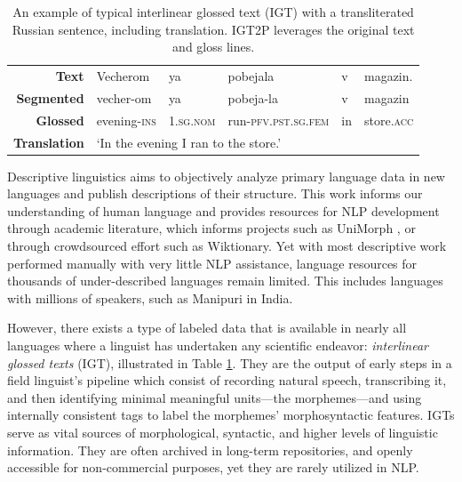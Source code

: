 \begin{table}[]
    \centering
    \begin{tabular}{rlllll}
       \textbf{Text}  & Vecherom & ya & pobejala & v & magazin. \\
      \textbf{Segmented}   & vecher-om & ya & pobeja-la & v & magazin \\
      \textbf{Glossed} & evening-\textsc{ins} & \textsc{1.sg.nom} & run-\textsc{pfv.pst.sg.fem} & in & store.\textsc{acc} \\
      \textbf{Translation} & \multicolumn{5}{l}{`In the evening I ran to the store.'}
    \end{tabular}
    \caption[IGT example]{An example of typical interlinear glossed text (IGT) with a transliterated Russian sentence, including translation. IGT2P leverages the original text and gloss lines.}
    \label{tab:IGT}
\end{table}


Descriptive linguistics aims to objectively analyze primary language data in new languages and publish descriptions of their structure. This work informs our understanding of human language and provides resources for NLP development through academic literature, which informs projects such as UniMorph \citep{kirov_unimorph}, or through crowdsourced effort such as Wiktionary. Yet with most descriptive work performed manually with very little NLP assistance, language resources for thousands of under-described languages remain limited. This includes languages with millions of speakers, such as Manipuri in India.

However, there exists a type of labeled data that is available in nearly all languages where a linguist has undertaken any scientific endeavor: \textit{interlinear glossed texts} (IGT), illustrated in Table \ref{tab:IGT}. They are the output of early steps in a field linguist's pipeline which consist of recording natural speech, transcribing it, and then identifying minimal meaningful units---the morphemes---and using internally consistent tags to label the morphemes' morphosyntactic features. IGTs serve as vital sources of morphological, syntactic, and higher levels of linguistic information. They are often archived in long-term repositories, and openly accessible for non-commercial purposes, yet they are rarely utilized in NLP.

